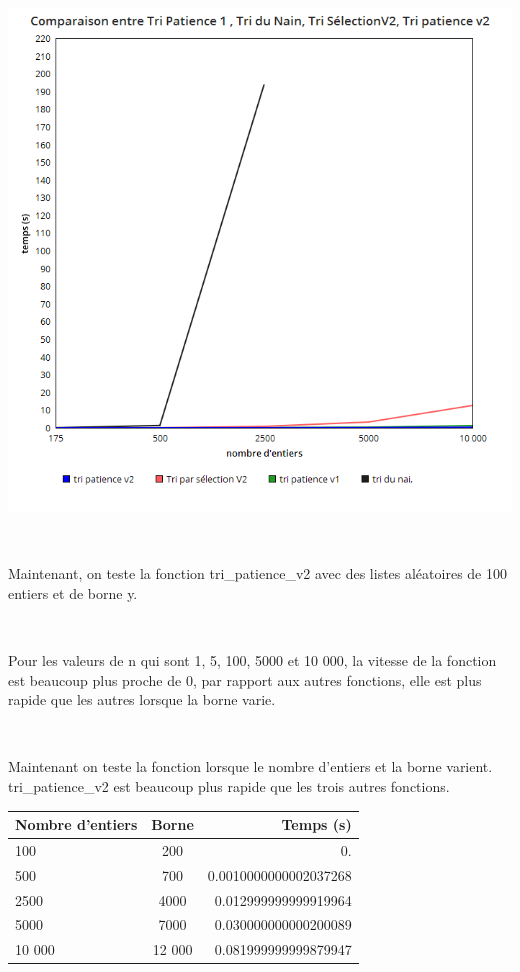 \documentclass[a4paper, 12pt]{article}
\begin{document}
\begin{center}
\includegraphics[scale=0.25]{tri_patience2_comparaisonN.png}
\end{center}
~

Maintenant, on teste la fonction tri\_patience\_v2 avec des listes aléatoires de 100 entiers et de borne y.

~

Pour les valeurs de n qui sont 1, 5, 100, 5000 et 10 000, la vitesse de la fonction est beaucoup plus proche de 0, par rapport aux autres fonctions, elle est plus rapide que les autres lorsque la borne varie.

~

Maintenant on teste la fonction lorsque le nombre d'entiers et la borne varient. tri\_patience\_v2 est beaucoup plus rapide que les trois autres fonctions.

\begin{table}[htbp]
  \centering
  \begin{tabular}{||l|c|r||}\hline
    \textbf{Nombre d'entiers} & \textbf{Borne} & \textbf{Temps (s)}\\\hline\hline
    100                     &    200                  &  0.            \\\hline
    500                 & 700               & 0.0010000000002037268 \\\hline
    2500                 & 4000             & 0.012999999999919964 \\\hline
    5000                & 7000             & 0.030000000000200089  \\\hline
    10 000                 & 12 000         & 0.081999999999879947 \\\hline
  \end{tabular}
  \label{tablepat2}
\end{table}
\end{document}
